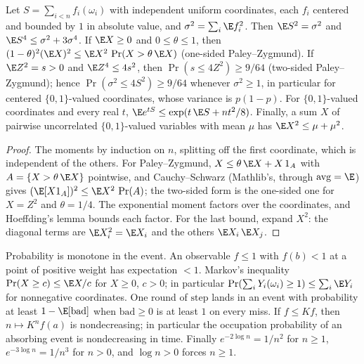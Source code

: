 \begin{theorem}\label{thm:moments}
\leanok{}
Let $S=\sum_{i<n}f_i(\omega_i)$ with independent uniform coordinates, each $f_i$
centered and bounded by $1$ in absolute value, and $\sigma^2=\sum_i\E f_i^2$. Then
$\E S^2=\sigma^2$ and $\E S^4\le\sigma^2+3\sigma^4$. If $\E X\ge0$ and $0\le\theta\le1$,
then $(1-\theta)^2(\E X)^2\le\E X^2\,\Pr(X>\theta\,\E X)$ (one-sided Paley--Zygmund). If $\E Z^2=s>0$ and
$\E Z^4\le4s^2$, then $\Pr(s\le4Z^2)\ge9/64$ (two-sided Paley--Zygmund); hence
$\Pr(\sigma^2\le4S^2)\ge9/64$ whenever $\sigma^2\ge1$, in particular for centered
$\{0,1\}$-valued coordinates, whose variance is $p(1-p)$. For $\{0,1\}$-valued
coordinates and every real $t$, $\E e^{tS}\le\exp(t\,\E S+nt^2/8)$. Finally, a sum
$X$ of pairwise uncorrelated $\{0,1\}$-valued variables with mean $\mu$ has
$\E X^2\le\mu+\mu^2$.
\end{theorem}
\begin{proof}\leanok
The moments by induction on $n$, splitting off the first coordinate, which is
independent of the others. For Paley--Zygmund, $X\le\theta\,\E X+X\,1_A$ with
$A=\{X>\theta\,\E X\}$ pointwise, and Cauchy--Schwarz (Mathlib's, through
$\operatorname{avg}=\E$) gives $(\E[X 1_A])^2\le\E X^2\,\Pr(A)$; the two-sided form is the
one-sided one for $X=Z^2$ and $\theta=1/4$. The exponential moment factors over the
coordinates, and Hoeffding's lemma bounds each factor. For the last bound, expand
$X^2$: the diagonal terms are $\E X_i^2=\E X_i$ and the others $\E X_i\,\E X_j$.
\end{proof}
\begin{lemma}\label{lem:tail}
\leanok{}
Probability is monotone in the event. An observable $f\le1$ with $f(b)<1$ at a
point of positive weight has expectation $<1$. Markov's inequality
$\Pr(X\ge c)\le\E X/c$ for $X\ge0$, $c>0$; in particular
$\Pr(\sum_iY_i(\omega_i)\ge1)\le\sum_i\E Y_i$ for nonnegative coordinates. One
round of $\mathrm{step}$ lands in an event with probability at least
$1-\E[\mathrm{bad}]$ when $\mathrm{bad}\ge0$ is at least $1$ on every miss. If
$f\le Kf$, then $n\mapsto K^nf(a)$ is nondecreasing; in particular the occupation
probability of an absorbing event is nondecreasing in time. Finally
$e^{-2\log n}=1/n^2$ for $n\ge1$, $e^{-3\log n}=1/n^3$ for $n>0$, and $\log n>0$
forces $n\ge1$.
\end{lemma}
